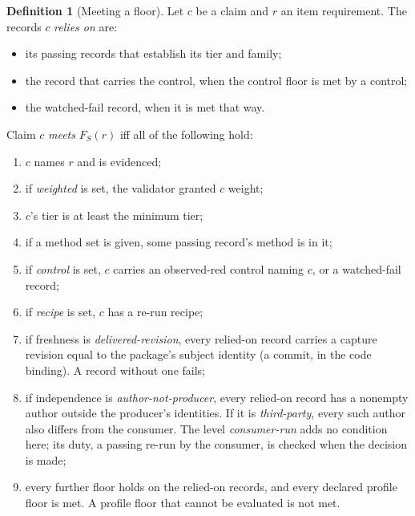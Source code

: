\documentclass[11pt]{article}
\theoremstyle{definition}
\newtheorem{definition}{Definition}
\theoremstyle{remark}
\begin{document}
\begin{definition}[Meeting a floor]\label{def:meet}
Let $c$ be a claim and $r$ an item requirement. The records $c$ \emph{relies on} are:
\begin{itemize}[itemsep=1pt]
\item its passing records that establish its tier and family;
\item the record that carries the control, when the control floor is met by a control;
\item the watched-fail record, when it is met that way.
\end{itemize}
Claim $c$ \emph{meets} $F_S(r)$ iff all of the following hold:
\begin{enumerate}[label=(\roman*),itemsep=1pt]
\item $c$ names $r$ and is evidenced;
\item if \emph{weighted} is set, the validator granted $c$ weight;
\item $c$'s tier is at least the minimum tier;
\item if a method set is given, some passing record's method is in it;
\item if \emph{control} is set, $c$ carries an observed-red control naming $c$, or a watched-fail
  record;
\item if \emph{recipe} is set, $c$ has a re-run recipe;
\item if freshness is \emph{delivered-revision}, every relied-on record carries a capture revision
  equal to the package's subject identity (a commit, in the code binding). A record without one
  fails;
\item if independence is \emph{author-not-producer}, every relied-on record has a nonempty author
  outside the producer's identities. If it is \emph{third-party}, every such author also differs
  from the consumer. The level \emph{consumer-run} adds no condition here; its duty, a passing
  re-run by the consumer, is checked when the decision is made;
\item every further floor holds on the relied-on records, and every declared profile floor is met.
  A profile floor that cannot be evaluated is not met.
\end{enumerate}
\end{definition}
\end{document}
